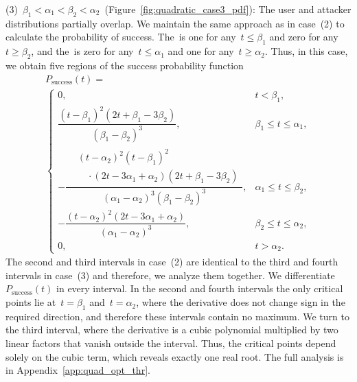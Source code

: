 \documentclass[conference,compsoc]{IEEEtran}
\begin{document}
(3)~$\beta_{1} < \alpha_{1} < \beta_{2} < \alpha_{2}$~(Figure~\ref{fig:quadratic_case3_pdf}): The user and attacker distributions partially overlap. We maintain the same approach as in case~(2) to calculate the probability of success. The~\FAR is one for any~$t \le \beta_1$ and zero for any~$t \ge \beta_2$, and the~\FRR is zero for any~$t \le \alpha_1$ and one for any~$t \ge \alpha_2$. Thus, in this case, we obtain five regions of the success probability function
\begin{multline*}
P_{\mathrm{success}}(t)=\\
\begin{cases}
0,
& t<\beta_1,\\[8pt]
\dfrac{(t-\beta_1)^2(2t+\beta_1-3\beta_2)}
{(\beta_1-\beta_2)^3},
& \beta_1 \le t \le \alpha_1,\\[12pt]
-\dfrac{\begin{aligned}&(t-\alpha_2)^2(t-\beta_1)^2\\&\quad\cdot(2t-3\alpha_1+\alpha_2)(2t+\beta_1-3\beta_2)\end{aligned}}{(\alpha_1-\alpha_2)^3(\beta_1-\beta_2)^3},
& \alpha_1 \le t \le \beta_2,\\[16pt]
-\dfrac{(t-\alpha_2)^2(2t-3\alpha_1+\alpha_2)}
{(\alpha_1-\alpha_2)^3},
& \beta_2 \le t \le \alpha_2,\\[8pt]
0,
& t>\alpha_2.
\end{cases}
\end{multline*}
The second and third intervals in case~(2) are identical to the third and fourth intervals in case~(3) and therefore, we analyze them together. 
We differentiate~$P_{\text{success}}(t)$ in every interval. In the second and fourth intervals the only critical points lie at~$t=\beta_1$ and~$t=\alpha_2$, where the derivative does not change sign in the required direction, and therefore these intervals contain no maximum. We turn to the third interval, where the derivative is a cubic polynomial multiplied by two linear factors that vanish outside the interval. Thus, the critical points depend solely on the cubic term, which reveals exactly one real root. The full analysis is in Appendix~\ref{app:quad_opt_thr}.
\end{document}
